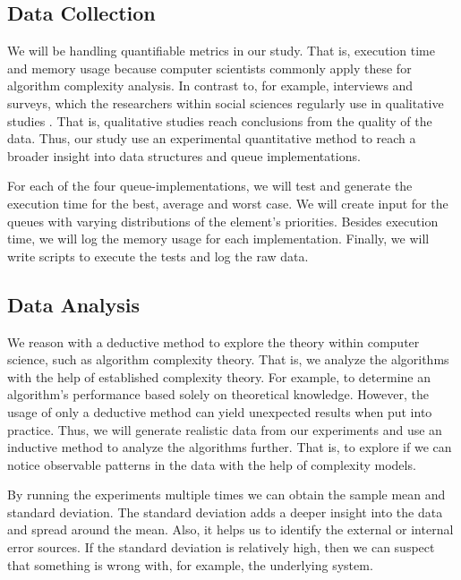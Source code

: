 \documentclass[a4paper,11pt]{kth-mag}
\newcommand*{\skippara}{\par\vspace{\baselineskip} \noindent}
\begin{document}
\subsection{Data Collection}
We will be handling quantifiable metrics in our study.
That is, execution time and memory usage because computer scientists commonly apply these for algorithm complexity analysis.
In contrast to, for example, interviews and surveys, which the researchers within social sciences regularly use in qualitative studies \cite{Omexperi69:online, haakansson2013portal}.
That is, qualitative studies reach conclusions from the quality of the data.
Thus, our study use an experimental quantitative method to reach a broader insight into data structures and queue implementations.

\skippara For each of the four queue-implementations, we will test and generate the execution time for the best, average and worst case.
We will create input for the queues with varying distributions of the element's priorities.
Besides execution time, we will log the memory usage for each implementation.
Finally, we will write scripts to execute the tests and log the raw data.

\subsection{Data Analysis}
We reason with a deductive method to explore the theory within computer science, such as algorithm complexity theory.
That is, we analyze the algorithms with the help of established complexity theory.
For example, to determine an algorithm's performance based solely on theoretical knowledge.
However, the usage of only a deductive method can yield unexpected results when put into practice.
Thus, we will generate realistic data from our experiments and use an inductive method to analyze the algorithms further.
That is, to explore if we can notice observable patterns in the data with the help of complexity models.

\skippara By running the experiments multiple times we can obtain the sample mean and standard deviation.
The standard deviation adds a deeper insight into the data and spread around the mean.
Also, it helps us to identify the external or internal error sources.
If the standard deviation is relatively high, then we can suspect that something is wrong with, for example, the underlying system.
\end{document}
